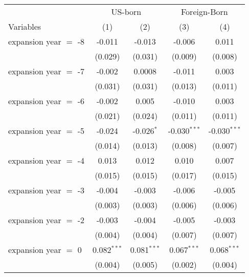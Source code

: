 \documentclass[
]{article}
\let\origtable\table
\let\endorigtable\endtable
\renewenvironment{table}[1][ht]{
      \expandafter\origtable\expandafter[H]
    }{
      \endorigtable
    }
\begin{document}
\begin{table}[htbp]
   \caption{The Impact of Medicaid Expansion on Medicaid Coverage }
   \centering
   \small
   \begin{tabular}{lcccc}
      \tabularnewline \midrule \midrule
       & \multicolumn{2}{c}{US-born} & \multicolumn{2}{c}{Foreign-Born} \\ \cmidrule(lr){2-3} \cmidrule(lr){4-5}
      Variables             & (1)           & (2)           & (3)            & (4)\\  
      \midrule 
      expansion year $=$ -8 & -0.011        & -0.013        & -0.006         & 0.011\\   
                            & (0.029)       & (0.031)       & (0.009)        & (0.008)\\   
      expansion year $=$ -7 & -0.002        & 0.0008        & -0.011         & 0.003\\   
                            & (0.031)       & (0.031)       & (0.013)        & (0.011)\\   
      expansion year $=$ -6 & -0.002        & 0.005         & -0.010         & 0.003\\   
                            & (0.021)       & (0.024)       & (0.011)        & (0.011)\\   
      expansion year $=$ -5 & -0.024        & -0.026$^{*}$  & -0.030$^{***}$ & -0.030$^{***}$\\   
                            & (0.014)       & (0.013)       & (0.008)        & (0.007)\\   
      expansion year $=$ -4 & 0.013         & 0.012         & 0.010          & 0.007\\   
                            & (0.015)       & (0.015)       & (0.017)        & (0.015)\\   
      expansion year $=$ -3 & -0.004        & -0.003        & -0.006         & -0.005\\   
                            & (0.003)       & (0.003)       & (0.006)        & (0.006)\\   
      expansion year $=$ -2 & -0.003        & -0.004        & -0.005         & -0.003\\   
                            & (0.004)       & (0.004)       & (0.007)        & (0.007)\\   
      expansion year $=$ 0  & 0.082$^{***}$ & 0.081$^{***}$ & 0.067$^{***}$  & 0.068$^{***}$\\   
                            & (0.004)       & (0.005)       & (0.002)        & (0.004)\\   

\end{tabular}
\end{table}
\end{document}
